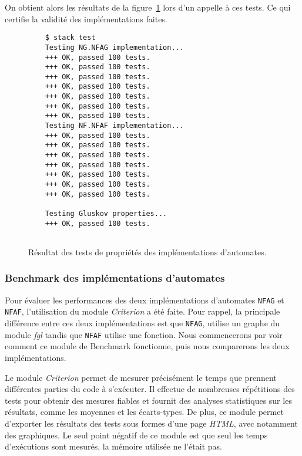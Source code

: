 \vphantom{}

On obtient alors les résultats de la figure~\ref{fig:resTest} lors d'un appelle
à ces tests. Ce qui certifie la validité des implémentations faites.

\begin{figure}[H]
    \begin{verbatim}
    $ stack test
    Testing NG.NFAG implementation...
    +++ OK, passed 100 tests.
    +++ OK, passed 100 tests.
    +++ OK, passed 100 tests.
    +++ OK, passed 100 tests.
    +++ OK, passed 100 tests.
    +++ OK, passed 100 tests.
    +++ OK, passed 100 tests.
    Testing NF.NFAF implementation...
    +++ OK, passed 100 tests.
    +++ OK, passed 100 tests.
    +++ OK, passed 100 tests.
    +++ OK, passed 100 tests.
    +++ OK, passed 100 tests.
    +++ OK, passed 100 tests.
    +++ OK, passed 100 tests.
    
    Testing Gluskov properties...
    +++ OK, passed 100 tests.
    
  \end{verbatim}
    \caption{Résultat des tests de propriétés des implémentations d'automates.}
    \label{fig:resTest}
\end{figure}

\subsubsection{Benchmark des implémentations d'automates}\label{section:bench}

Pour évaluer les performances des deux implémentations d'automates
\texttt{NFAG} et \texttt{NFAF}, l'utilisation du
module \textit{Criterion} a été faite. Pour rappel, la principale différence
entre ces deux implémentations est que \texttt{NFAG}, utilise un
graphe du module \textit{fgl} tandis que \texttt{NFAF} utilise une
fonction. Nous commencerons par voir comment ce module de Benchmark fonctionne,
puis nous comparerons les deux implémentations.

\vphantom{}

Le module \textit{Criterion} permet de mesurer précisément le temps que
prennent différentes parties du code à s'exécuter. Il effectue de
nombreuses répétitions des tests pour obtenir des mesures fiables et fournit des
analyses statistiques sur les résultats, comme les moyennes et les écarts-types.
De plus, ce module permet d'exporter les résultats des tests sous formes d'une
page \textit{HTML}, avec notamment des graphiques. Le seul point négatif de ce
module est que seul les temps d'exécutions sont mesurés, la mémoire utilisée ne
l'était pas.

